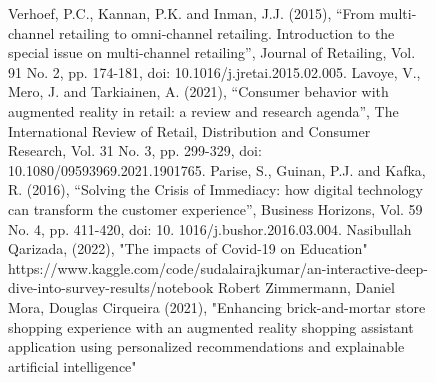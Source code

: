\documentclass[letterpaper, 10 pt, conference]{ieeeconf}
\begin{document}
\begin{figure}[h!]
\begin{thebibliography}{99}
 Verhoef, P.C., Kannan, P.K. and Inman, J.J. (2015), “From multi-channel retailing to omni-channel
retailing. Introduction to the special issue on multi-channel retailing”, Journal of Retailing,
Vol. 91 No. 2, pp. 174-181, doi: 10.1016/j.jretai.2015.02.005.
 Lavoye, V., Mero, J. and Tarkiainen, A. (2021), “Consumer behavior with augmented reality in retail: a
review and research agenda”, The International Review of Retail, Distribution and Consumer
Research, Vol. 31 No. 3, pp. 299-329, doi: 10.1080/09593969.2021.1901765.
 Parise, S., Guinan, P.J. and Kafka, R. (2016), “Solving the Crisis of Immediacy: how digital technology
can transform the customer experience”, Business Horizons, Vol. 59 No. 4, pp. 411-420, doi: 10.
1016/j.bushor.2016.03.004.
 Nasibullah Qarizada, (2022), "The impacts of Covid-19 on Education"
 https://www.kaggle.com/code/sudalairajkumar/an-interactive-deep-dive-into-survey-results/notebook
 Robert Zimmermann, Daniel Mora, Douglas Cirqueira (2021), "Enhancing brick-and-mortar store shopping experience with an
augmented reality shopping assistant application using personalized recommendations and explainable artificial intelligence"

\end{thebibliography}
\end{figure}
\end{document}
